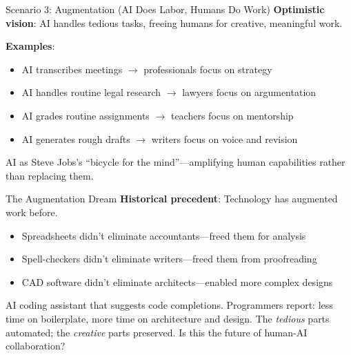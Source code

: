 ﻿\documentclass[aspectratio=169,11pt]{beamer}
\begin{document}
\begin{frame}{Scenario 3: Augmentation (AI Does Labor, Humans Do Work)}
\textbf{Optimistic vision}: AI handles tedious tasks, freeing humans for creative, meaningful work.

\vspace{0.3em}
\textbf{Examples}:
\begin{itemize}
    \item AI transcribes meetings $\rightarrow$ professionals focus on strategy
    \item AI handles routine legal research $\rightarrow$ lawyers focus on argumentation
    \item AI grades routine assignments $\rightarrow$ teachers focus on mentorship
    \item AI generates rough drafts $\rightarrow$ writers focus on voice and revision
\end{itemize}

\vspace{0.3em}
AI as Steve Jobs's ``bicycle for the mind''---amplifying human capabilities rather than replacing them.
\end{frame}

\begin{frame}{The Augmentation Dream}
\textbf{Historical precedent}: Technology has augmented work before.
\begin{itemize}
    \item Spreadsheets didn't eliminate accountants---freed them for analysis
    \item Spell-checkers didn't eliminate writers---freed them from proofreading
    \item CAD software didn't eliminate architects---enabled more complex designs
\end{itemize}

\vspace{0.2em}
\begin{casestudybox}
\scriptsize
AI coding assistant that suggests code completions. Programmers report: less time on boilerplate, more time on architecture and design. The \emph{tedious} parts automated; the \emph{creative} parts preserved. Is this the future of human-AI collaboration?
\end{casestudybox}
\end{frame}
\end{document}
